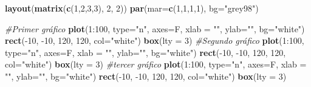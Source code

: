 \documentclass[]{article}
\newenvironment{Shaded}{\begin{snugshade}}{\end{snugshade}}
\newcommand{\KeywordTok}[1]{\textcolor[rgb]{0.13,0.29,0.53}{\textbf{{#1}}}}
\newcommand{\DataTypeTok}[1]{\textcolor[rgb]{0.13,0.29,0.53}{{#1}}}
\newcommand{\DecValTok}[1]{\textcolor[rgb]{0.00,0.00,0.81}{{#1}}}
\newcommand{\StringTok}[1]{\textcolor[rgb]{0.31,0.60,0.02}{{#1}}}
\newcommand{\CommentTok}[1]{\textcolor[rgb]{0.56,0.35,0.01}{\textit{{#1}}}}
\newcommand{\NormalTok}[1]{{#1}}
\begin{document}
\begin{Shaded}
\begin{Highlighting}[]
\KeywordTok{layout}\NormalTok{(}\KeywordTok{matrix}\NormalTok{(}\KeywordTok{c}\NormalTok{(}\DecValTok{1}\NormalTok{,}\DecValTok{2}\NormalTok{,}\DecValTok{3}\NormalTok{,}\DecValTok{3}\NormalTok{), }\DecValTok{2}\NormalTok{, }\DecValTok{2}\NormalTok{))}
\KeywordTok{par}\NormalTok{(}\DataTypeTok{mar=}\KeywordTok{c}\NormalTok{(}\DecValTok{1}\NormalTok{,}\DecValTok{1}\NormalTok{,}\DecValTok{1}\NormalTok{,}\DecValTok{1}\NormalTok{), }\DataTypeTok{bg=}\StringTok{"grey98"}\NormalTok{)}

\CommentTok{#Primer gráfico}
\KeywordTok{plot}\NormalTok{(}\DecValTok{1}\NormalTok{:}\DecValTok{100}\NormalTok{, }\DataTypeTok{type=}\StringTok{"n"}\NormalTok{, }\DataTypeTok{axes=}\NormalTok{F, }\DataTypeTok{xlab =} \StringTok{""}\NormalTok{, }\DataTypeTok{ylab=}\StringTok{""}\NormalTok{, }\DataTypeTok{bg=}\StringTok{"white"}\NormalTok{)}
\KeywordTok{rect}\NormalTok{(-}\DecValTok{10}\NormalTok{, -}\DecValTok{10}\NormalTok{, }\DecValTok{120}\NormalTok{, }\DecValTok{120}\NormalTok{, }\DataTypeTok{col=}\StringTok{"white"}\NormalTok{)}
\KeywordTok{box}\NormalTok{(}\DataTypeTok{lty =} \DecValTok{3}\NormalTok{)}
\CommentTok{#Segundo gráfico}
\KeywordTok{plot}\NormalTok{(}\DecValTok{1}\NormalTok{:}\DecValTok{100}\NormalTok{, }\DataTypeTok{type=}\StringTok{"n"}\NormalTok{, }\DataTypeTok{axes=}\NormalTok{F, }\DataTypeTok{xlab =} \StringTok{""}\NormalTok{, }\DataTypeTok{ylab=}\StringTok{""}\NormalTok{, }\DataTypeTok{bg=}\StringTok{"white"}\NormalTok{)}
\KeywordTok{rect}\NormalTok{(-}\DecValTok{10}\NormalTok{, -}\DecValTok{10}\NormalTok{, }\DecValTok{120}\NormalTok{, }\DecValTok{120}\NormalTok{, }\DataTypeTok{col=}\StringTok{"white"}\NormalTok{)}
\KeywordTok{box}\NormalTok{(}\DataTypeTok{lty =} \DecValTok{3}\NormalTok{)}
\CommentTok{#tercer gráfico}
\KeywordTok{plot}\NormalTok{(}\DecValTok{1}\NormalTok{:}\DecValTok{100}\NormalTok{, }\DataTypeTok{type=}\StringTok{"n"}\NormalTok{, }\DataTypeTok{axes=}\NormalTok{F, }\DataTypeTok{xlab =} \StringTok{""}\NormalTok{, }\DataTypeTok{ylab=}\StringTok{""}\NormalTok{, }\DataTypeTok{bg=}\StringTok{"white"}\NormalTok{)}
\KeywordTok{rect}\NormalTok{(-}\DecValTok{10}\NormalTok{, -}\DecValTok{10}\NormalTok{, }\DecValTok{120}\NormalTok{, }\DecValTok{120}\NormalTok{, }\DataTypeTok{col=}\StringTok{"white"}\NormalTok{)}
\KeywordTok{box}\NormalTok{(}\DataTypeTok{lty =} \DecValTok{3}\NormalTok{)}
\end{Highlighting}
\end{Shaded}
\end{document}
